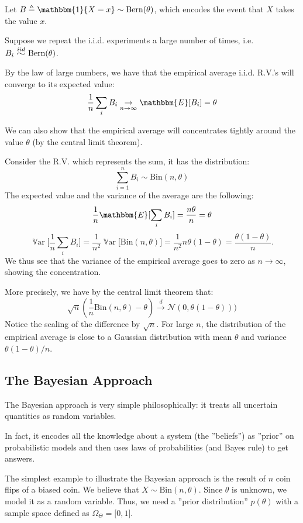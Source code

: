 \documentclass[12pt]{report}
\newcommand{\widesim}[2][1.5]{
  \mathrel{\overset{#2}{\scalebox{#1}[1]{$\sim$}}}
}
\renewcommand{\emph}[1]{\color{violet}#1\color{black}{}}
\DeclareMathOperator{\Var}{\mathbb{V}\text{ar}}
\newcommand{\Bern}{\text{Bern}}
\newcommand{\Bin}{\text{Bin}}
\begin{document}
Let $ B \triangleq \mathbbm{1}\{ X = x \} \sim \Bern (\theta) $, which encodes the event that $X$ takes the value $x$.

Suppose we repeat the i.i.d. experiments a large number of times, i.e. $ B_i \widesim{iid} \Bern(\theta)$.

By the \emph{law of large numbers}, we have that the empirical average i.i.d. R.V.'s will converge to its expected value: 
$$ \frac{1}{n} \sum_{i} B_i \underset{n \rightarrow \infty}{\rightarrow} \mathbbm{E}\lbrack B_i \rbrack = \theta $$

We can also show that the empirical average will concentrates tightly around the value $\theta$ (by the \emph{central limit theorem}).

Consider the R.V. which represents the sum, it has the distribution:
$$ \sum_{i = 1}^{n} B_i \sim \Bin(n, \theta) $$
The expected value and the variance of the average are the following:
$$ \frac{1}{n} \mathbbm{E} \lbrack \sum_{i} B_i \rbrack = \frac{n \theta}{n} = \theta $$ 
$$ \Var \lbrack \frac{1}{n} \sum_{i} B_i \rbrack = \frac{1}{n^2} \Var \lbrack \Bin(n, \theta) \rbrack = \frac{1}{n^2} n \theta (1 - \theta) = \frac{\theta (1 - \theta)}{n} .$$
We thus see that the variance of the empirical average goes to zero as $n \rightarrow \infty$, showing the concentration.

More precisely, we have by the central limit theorem that:
$$ \sqrt{n} \left( \frac{1}{n} \Bin(n, \theta) - \theta \right) \xrightarrow{d} \mathcal{N}(0, \theta (1 - \theta))) $$
Notice the scaling of the difference by $\sqrt{n}$. For large $n$, the distribution of the empirical average is close to a Gaussian distribution with mean $\theta$ and variance $\theta (1-\theta) / n$.

\subsection{The Bayesian Approach}
The Bayesian approach is very simple philosophically: it treats all uncertain quantities as random variables.

In fact, it encodes all the knowledge about a system (the ''beliefs'') as ''prior'' on probabilistic models and then uses laws of probabilities (and Bayes rule) to get answers.

The simplest example to illustrate the Bayesian approach is the result of $ n $ coin flips of a biased coin. We believe that $ X \sim \Bin(n, \theta) $. Since $ \theta $ is unknown, we model it as a random variable. Thus, we need a ''prior distribution'' $ p(\theta) $ with a sample space defined as $ \Omega_{\Theta} = \lbrack 0,1 \rbrack $.
\end{document}
